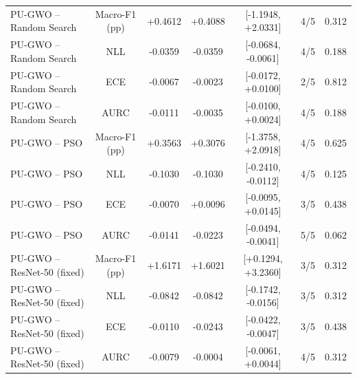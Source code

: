 \begin{table}[t]
\begin{tabular}{lcccccc}
PU-GWO -- Random Search & Macro-F1 (pp) & +0.4612 & +0.4088 & [-1.1948, +2.0331] & 4/5 & 0.312 \\
PU-GWO -- Random Search & NLL & -0.0359 & -0.0359 & [-0.0684, -0.0061] & 4/5 & 0.188 \\
PU-GWO -- Random Search & ECE & -0.0067 & -0.0023 & [-0.0172, +0.0100] & 2/5 & 0.812 \\
PU-GWO -- Random Search & AURC & -0.0111 & -0.0035 & [-0.0100, +0.0024] & 4/5 & 0.188 \\
PU-GWO -- PSO & Macro-F1 (pp) & +0.3563 & +0.3076 & [-1.3758, +2.0918] & 4/5 & 0.625 \\
PU-GWO -- PSO & NLL & -0.1030 & -0.1030 & [-0.2410, -0.0112] & 4/5 & 0.125 \\
PU-GWO -- PSO & ECE & -0.0070 & +0.0096 & [-0.0095, +0.0145] & 3/5 & 0.438 \\
PU-GWO -- PSO & AURC & -0.0141 & -0.0223 & [-0.0494, -0.0041] & 5/5 & 0.062 \\
PU-GWO -- ResNet-50 (fixed) & Macro-F1 (pp) & +1.6171 & +1.6021 & [+0.1294, +3.2360] & 3/5 & 0.312 \\
PU-GWO -- ResNet-50 (fixed) & NLL & -0.0842 & -0.0842 & [-0.1742, -0.0156] & 3/5 & 0.312 \\
PU-GWO -- ResNet-50 (fixed) & ECE & -0.0110 & -0.0243 & [-0.0422, -0.0047] & 3/5 & 0.438 \\
PU-GWO -- ResNet-50 (fixed) & AURC & -0.0079 & -0.0004 & [-0.0061, +0.0044] & 4/5 & 0.312 \\
\bottomrule
\end{tabular}
\end{table}
